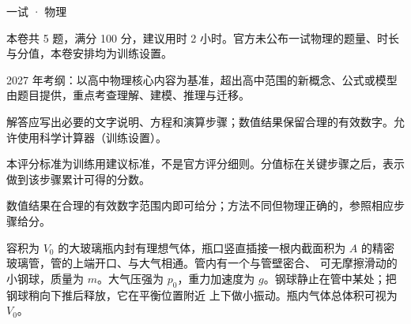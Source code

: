 \documentclass[cjk=noto, seal=first]{mojing-exam}
\begin{document}
\begin{paper}[time={建议 2 小时（训练设置）}, full=100]{一试 · 物理}

\begin{instructions}
  \item 本卷共 5 题，满分 100 分，建议用时 2 小时。官方未公布一试物理的题量、时长与分值，本卷安排均为训练设置。
  \item 2027 年考纲：以高中物理核心内容为基准，超出高中范围的新概念、公式或模型由题目提供，重点考查理解、建模、推理与迁移。
  \item 解答应写出必要的文字说明、方程和演算步骤；数值结果保留合理的有效数字。允许使用科学计算器（训练设置）。
\end{instructions}

\begin{gradingnotes}
  \item 本评分标准为训练用建议标准，不是官方评分细则。分值标在关键步骤之后，表示做到该步骤累计可得的分数。
  \item 数值结果在合理的有效数字范围内即可给分；方法不同但物理正确的，参照相应步骤给分。
\end{gradingnotes}


\begin{questions}

\question[20]
\begin{withfigure}[.24]{%
  }
容积为 $V_0$ 的大玻璃瓶内封有理想气体，瓶口竖直插接一根内截面积为 $A$ 的精密玻璃管，管的上端开口、与大气相通。管内有一个与管壁密合、
可无摩擦滑动的小钢球，质量为 $m$。大气压强为 $p_0$，重力加速度为 $g$。钢球静止在管中某处；把钢球稍向下推后释放，它在平衡位置附近
上下做小振动。瓶内气体总体积可视为 $V_0$。


\end{withfigure}
\end{questions}
\end{paper}
\end{document}

